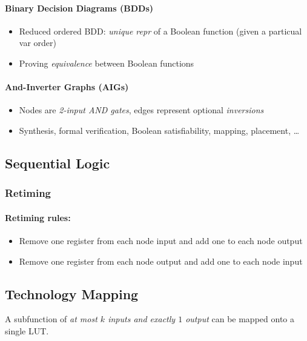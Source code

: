 \documentclass[a4paper]{article}
\begin{document}
\paragraph{Binary Decision Diagrams (BDDs)}
\begin{itemize}
    \item Reduced ordered BDD: \emph{unique repr} of a Boolean function (given a particual var order)
    \item Proving \emph{equivalence} between Boolean functions
\end{itemize}

\paragraph{And-Inverter Graphs (AIGs)}
\begin{itemize}
    \item Nodes are \emph{2-input AND gates}, edges represent optional \emph{inversions}
    \item Synthesis, formal verification, Boolean satisfiability, mapping, placement, \dots
\end{itemize}

\subsection{Sequential Logic}

\subsubsection{Retiming}

\paragraph{Retiming rules:}
\begin{itemize}
    \item Remove one register from each node input and add one to each node output
    \item Remove one register from each node output and add one to each node input
\end{itemize}

\subsection{Technology Mapping}

A subfunction of \emph{at most $k$ inputs and exactly $1$ output} can be mapped onto a single LUT.
\end{document}
